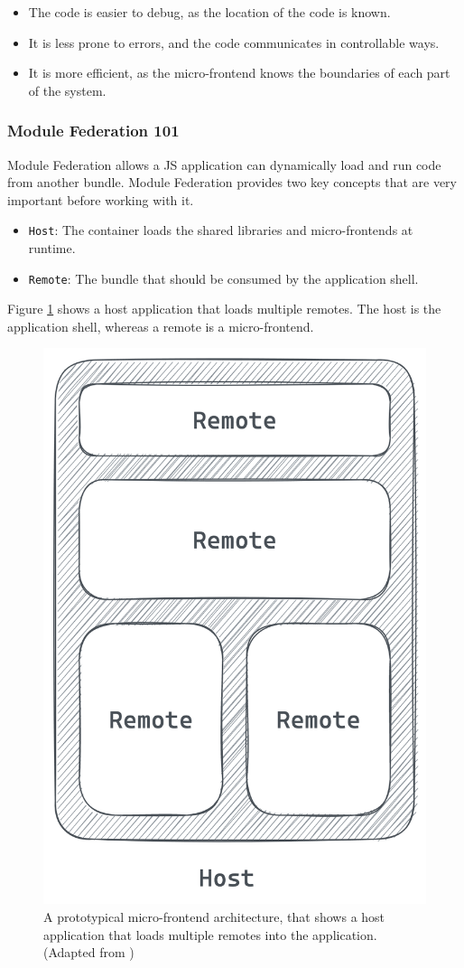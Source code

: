 \begin{itemize}
    \item The code is easier to debug, as the location of the code is known.
    \item It is less prone to errors, and the code communicates in controllable ways.
    \item It is more efficient, as the micro-frontend knows the boundaries of each part of the system.
\end{itemize}

\subsubsection{Module Federation 101}\label{subsubsection:background:micro-frontend:module-federation:101}

Module Federation allows a \ac{JS} application can dynamically load and run code from another bundle. Module Federation provides two key concepts that are very important before working with it. \cite[118-119]{book:2021:mezzalira:applied-methods:building-micro-frontends}

\begin{itemize}
    \item \texttt{Host}: The container loads the shared libraries and micro-frontends at runtime.
    \item \texttt{Remote}: The bundle that should be consumed by the application shell.
\end{itemize}

\noindent Figure \ref{fig:background:micro-frontend:module-federation:module-federation-architecture} shows a host application that loads multiple remotes. The host is the application shell, whereas a remote is a micro-frontend.

\ifshowImages
\begin{figure}[H]
    \centering
    \includegraphics[width=0.3\linewidth]{images/background/micro-frontends/module-federation/module-federation-architecture.png}
    \caption{A prototypical micro-frontend architecture, that shows a host application that loads multiple remotes into the application. (Adapted from \cite[119]{book:2021:mezzalira:applied-methods:building-micro-frontends})
    }\label{fig:background:micro-frontend:module-federation:module-federation-architecture}
\end{figure}
\fi

